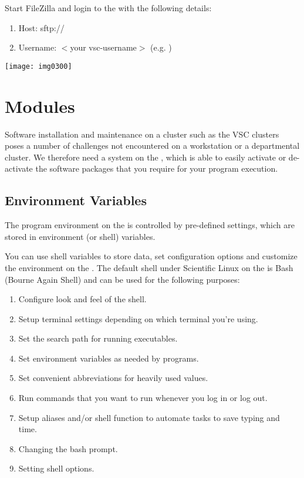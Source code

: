   Start FileZilla and login to the \hpc with the following details:

  \begin{enumerate}
  \item  Host: sftp://\loginnode
  \item  Username:  $<$your vsc-username$>$ (e.g. \userid)
  \end{enumerate}

  \texttt{[image: img0300]}
\fi

\section{Modules}

Software installation and maintenance on a \hpc cluster such as the VSC
clusters poses a number of challenges not encountered on a workstation or a
departmental cluster. We therefore need a system on the \hpc, which is able
to easily activate or de-activate the software packages that you require for
your program execution.

\subsection{Environment Variables}

The program environment on the \hpc is controlled by pre-defined settings,
which are stored in environment (or shell) variables.

You can use shell variables to store data, set configuration options and
customize the environment on the \hpc. The default shell under Scientific
Linux on the \hpc is Bash (Bourne Again Shell) and can be used for the
following purposes:

\begin{enumerate}
\item  Configure look and feel of the shell.
\item  Setup terminal settings depending on which terminal you're using.
\item  Set the search path for running executables.
\item  Set environment variables as needed by programs.
\item  Set convenient abbreviations for heavily used values.
\item  Run commands that you want to run whenever you log in or log out.
\item  Setup aliases and/or shell function to automate tasks to save typing and time.
\item  Changing the bash prompt.
\item  Setting shell options.
\end{enumerate}

